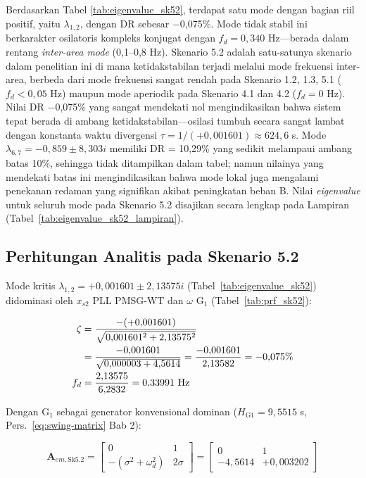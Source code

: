 Berdasarkan Tabel \ref{tab:eigenvalue_sk52}, terdapat satu mode dengan bagian
riil positif, yaitu $\lambda_{1,2}$, dengan DR sebesar $-$0,075\%. Mode tidak
stabil ini berkarakter osilatoris kompleks konjugat dengan $f_d = 0{,}340$ Hz---berada
dalam rentang \textit{inter-area mode} (0,1--0,8 Hz). Skenario 5.2 adalah
satu-satunya skenario dalam penelitian ini di mana ketidakstabilan terjadi melalui
mode frekuensi inter-area, berbeda dari mode frekuensi sangat rendah pada Skenario
1.2, 1.3, 5.1 ($f_d < 0{,}05$ Hz) maupun mode aperiodik pada Skenario 4.1 dan 4.2
($f_d = 0$ Hz). Nilai DR $-$0,075\% yang sangat mendekati nol mengindikasikan
bahwa sistem tepat berada di ambang ketidakstabilan---osilasi tumbuh secara sangat
lambat dengan konstanta waktu divergensi $\tau = 1/(+0{,}001601) \approx 624{,}6$ s.
Mode $\lambda_{6,7} = -0{,}859 \pm 8{,}303i$ memiliki DR = 10,29\% yang sedikit
melampaui ambang batas 10\%, sehingga tidak ditampilkan dalam tabel; namun
nilainya yang mendekati batas ini mengindikasikan bahwa mode lokal juga mengalami
penekanan redaman yang signifikan akibat peningkatan beban B. Nilai \textit{eigenvalue}
untuk seluruh mode pada Skenario 5.2 disajikan secara lengkap pada Lampiran (Tabel~\ref{tab:eigenvalue_sk52_lampiran}).

\subsection{Perhitungan Analitis pada Skenario 5.2}

Mode kritis $\lambda_{1,2} = +0{,}001601 \pm 2{,}13575i$
(Tabel~\ref{tab:eigenvalue_sk52}) didominasi oleh $x_{s2}$ PLL PMSG-WT dan
$\omega$ G$_1$ (Tabel~\ref{tab:prf_sk52}):

\begin{align}
    \zeta &= \frac{-(+0{,}001601)}{\sqrt{0{,}001601^2 + 2{,}13575^2}} \notag \\
          &= \frac{-0{,}001601}{\sqrt{0{,}000003 + 4{,}5614}}
           = \frac{-0{,}001601}{2{,}13582} = -0{,}075\% \\
    f_d   &= \frac{2{,}13575}{6{,}2832} = 0{,}33991 \text{ Hz}
\end{align}

Dengan G$_1$ sebagai generator konvensional dominan ($H_{\text{G1}} = 9{,}5515$ s,
Pers.~\ref{eq:swing-matrix} Bab 2):

\begin{equation}
    \mathbf{A}_{em,\text{Sk5.2}} =
    \begin{bmatrix}
        0 & 1 \\[4pt]
        -(\sigma^2 + \omega_d^2) & 2\sigma
    \end{bmatrix}
    =
    \begin{bmatrix}
        0 & 1 \\[4pt]
        -4{,}5614 & +0{,}003202
    \end{bmatrix}
    \label{eq:Aem_sk52}
\end{equation}

